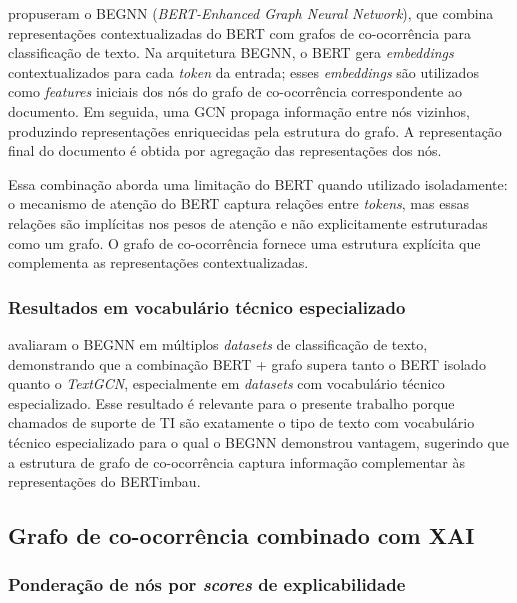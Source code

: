 \documentclass[
    12pt,                %
    openright,           %
    oneside,             %
    a4paper,             %
    english,             %
    brazil               %
]{abntex2}
\begin{document}
 propuseram o BEGNN (\textit{BERT-Enhanced Graph Neural Network}), que combina representações contextualizadas do BERT com grafos de co-ocorrência para classificação de texto. Na arquitetura BEGNN, o BERT gera \textit{embeddings} contextualizados para cada \textit{token} da entrada; esses \textit{embeddings} são utilizados como \textit{features} iniciais dos nós do grafo de co-ocorrência correspondente ao documento. Em seguida, uma GCN propaga informação entre nós vizinhos, produzindo representações enriquecidas pela estrutura do grafo. A representação final do documento é obtida por agregação das representações dos nós.

Essa combinação aborda uma limitação do BERT quando utilizado isoladamente: o mecanismo de atenção do BERT captura relações entre \textit{tokens}, mas essas relações são implícitas nos pesos de atenção e não explicitamente estruturadas como um grafo. O grafo de co-ocorrência fornece uma estrutura explícita que complementa as representações contextualizadas.

\subsubsection{Resultados em vocabulário técnico especializado}
\label{subsubsec:bert_grafo_resultados}

 avaliaram o BEGNN em múltiplos \textit{datasets} de classificação de texto, demonstrando que a combinação BERT + grafo supera tanto o BERT isolado quanto o \textit{TextGCN}, especialmente em \textit{datasets} com vocabulário técnico especializado. Esse resultado é relevante para o presente trabalho porque chamados de suporte de TI são exatamente o tipo de texto com vocabulário técnico especializado para o qual o BEGNN demonstrou vantagem, sugerindo que a estrutura de grafo de co-ocorrência captura informação complementar às representações do BERTimbau.

\subsection{Grafo de co-ocorrência combinado com XAI}
\label{subsec:grafo_xai}

\subsubsection{Ponderação de nós por \textit{scores} de explicabilidade}
\label{subsubsec:grafo_xai_ponderacao}
\end{document}
